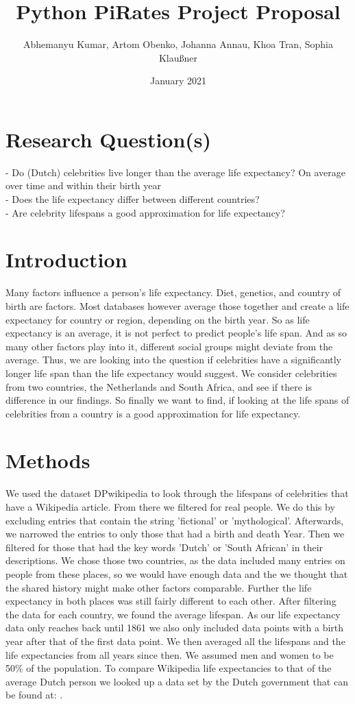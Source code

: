 \documentclass{article}
\title{Python PiRates Project Proposal}
\author{Abhemanyu Kumar, Artom Obenko, Johanna Annau, Khoa Tran, Sophia Klaußner}
\date{January 2021}
\begin{document}
	
\maketitle
	
\section{Research Question(s)}
- Do (Dutch) celebrities live longer than the average life expectancy? On average over time and within their birth year\\
- Does the life expectancy differ between different countries?\\
- Are celebrity lifespans a good approximation for life expectancy?\\
	
\section{Introduction}
Many factors influence a person's life expectancy. Diet, genetics, and country of birth are factors. Most databases however average those together and create a life expectancy for country or region, depending on the birth year.
So as life expectancy is an average, it is not perfect to predict people's life span. And as so many other factors play into it, different social groups might deviate from the average. Thus, we are looking into the question if celebrities have a significantly longer life span than the life expectancy would suggest. We consider celebrities from two countries, the Netherlands and South Africa, and see if there is difference in our findings. So finally we want to find, if looking at the life spans of celebrities from a country is a good approximation for life expectancy.

\section{Methods}
We used the dataset DPwikipedia to look through the lifespans of celebrities that have a Wikipedia article. From there we filtered for real people. We do this by excluding entries that contain the string 'fictional' or 'mythological'. Afterwards, we narrowed the entries to only those that had a birth and death Year. Then we filtered for those that had the key words 'Dutch' or 'South African' in their descriptions. We chose those two countries, as the data included many entries on people from these places, so we would have enough data and the we thought that the shared history might make other factors comparable. Further the life expectancy in both places was still fairly different to each other. After filtering the data for each country, we found the average lifespan. As our life expectancy data only reaches back until 1861 we also only included data points with a birth year after that of the first data point. We then averaged all the lifespans and the life expectancies from all years since then. We assumed men and women to be 50\% of the population. To compare Wikipedia life expectancies to that of the average Dutch person we looked up a data set by the Dutch government that can be found at: \cite{Levensverwachting}. 
\end{document}
